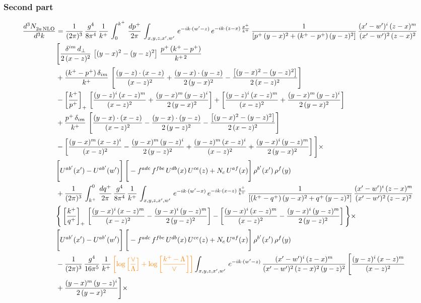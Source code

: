 \documentclass[9pt]{article}
\numberwithin{equation}{section}
\begin{document}
\subsubsection*{Second part}
\begin{align}
    \frac{d^{3}N_{2a\,\rm NLO}^{\rm}}{d^{3}k}  & =  \frac{1}{(2\pi)^{3}}\, \frac{g^{4}}{8\pi^{4}}\,\frac{1}{k^{+}}\,\int_{0}^{k^{+}}\, \frac{dp^{+}}{2\pi}\,\int_{x,y,z,x',w'}\,e^{-ik\cdot(w'-z)}\,e^{-ik\cdot (z-x)\,\frac{p^{+}}{k^{+}}}\,\frac{1}{\left[p^{+}\,(y-x)^{2}+(k^{+}-p^{+})\,(y-z)^{2}\right]}\, \frac{(x'-w')^{i}\,(z-x)^{m}}{(x'-w')^{2}\,(z-x)^{2}} \notag \\ & \Bigg[\frac{\delta^{im}\,d_{\perp}}{2\,(x-z)^{2}}\,\left[(y-x)^{2}-(y-z)^{2}\right]\,\frac{p^{+}\,(k^{+}-p^{+})}{k^{+\,2}}\notag \\ & +\frac{(k^{+}-p^{+})\,\delta_{im}}{k^{+}}\,\left[\frac{(y-z)\cdot (x-z)}{(x-z)^{2}}+\frac{(y-x)\cdot (y-z)}{2\,(y-x)^{2}}-\frac{\left[(y-x)^{2}-(y-z)^{2}\right]}{2\,(x-z)^{2}}\right]\notag \\ & -\left[\frac{k^{+}}{p^{+}}\right]_{+}\,\left[\frac{(y-z)^{i}\,(x-z)^{m}}{(x-z)^{2}}+\frac{(y-x)^{m}\,(y-z)^{i}}{2\,(y-x)^{2}}\right]+ \left[\frac{(y-z)^{i}\,(x-z)^{m}}{(x-z)^{2}}+\frac{(y-x)^{m}\,(y-z)^{i}}{2\,(y-x)^{2}}\right]\notag \\ & +\frac{p^{+}\,\delta_{im}}{k^{+}}\,\left[\frac{(y-x)\cdot (x-z)}{(x-z)^{2}}-\frac{(y-x)\cdot (y-z)}{2\,(y-z)^{2}}-\frac{\left[(y-x)^{2}-(y-z)^{2}\right]}{2\,(x-z)^{2}}\right]\notag \\ &-\left[\frac{(y-x)^{m}\,(x-z)^{i}}{(x-z)^{2}}-\frac{(y-x)^{m}\,(y-z)^{i}}{2\,(y-z)^{2}}+\frac{(y-z)^{m}\,(x-z)^{i}}{(x-z)^{2}}+\frac{(y-x)^{i}\,(y-z)^{m}}{2\,(y-x)^{2}}\right]\Bigg]\times \notag \\ & \Bigg[U^{ab'}(x')-U^{ab'}(w')\Bigg]\,\Bigg[-f^{adc}\,f^{fbe}\,U^{db}(x)\,U^{ce}(z)+N_{c}\,U^{af}(x)\Bigg]\,\rho^{b'}(x')\,\rho^{f}(y)\notag \\ & + \frac{1}{(2\pi)^{3}}\,\int^{0}_{k^{+}}\, \frac{dq^{+}}{2\pi} \,\frac{g^{4}}{8\pi^{4}}\,\frac{1}{k^{+}}\, \int_{x,y,z,x',w'}\,e^{-ik\cdot(w'-x)}\,e^{-ik\cdot (x-z)\,\frac{q^{+}}{k^{+}}}\, \frac{1}{\left[(k^{+}-q^{+})\,(y-x)^{2}+q^{+}\,(y-z)^{2}\right]}\, \frac{(x'-w')^{i}\,(z-x)^{m}}{(x'-w')^{2}\,(z-x)^{2}} \notag \\ &\Bigg\{\left[\frac{k^{+}}{q^{+}}\right]_{+}\,\left[\frac{(y-x)^{i}\,(x-z)^{m}}{(x-z)^{2}}-\frac{(y-x)^{i}\,(y-z)^{m}}{2\,(y-z)^{2}}\right] -\left[\frac{(y-x)^{i}\,(x-z)^{m}}{(x-z)^{2}}-\frac{(y-x)^{i}\,(y-z)^{m}}{2\,(y-z)^{2}}\right]\Bigg\}\times\,\notag \\ & \Bigg[U^{ab'}(x')-U^{ab'}(w')\Bigg]\,\Bigg[-f^{adc}\,f^{fbe}\,U^{db}(x)\,U^{ce}(z)+N_{c}\,U^{af}(x)\Bigg]\,\rho^{b'}(x')\,\rho^{f}(y)\notag \\ & - \frac{1}{(2\pi)^{3}}\, \frac{g^{4}}{16\pi^{5}}\,\frac{1}{k^{+}}\,{\color{orange}\left[\log{\left[\frac{\vee}{\Lambda}\right]}+\log{\left[\frac{k^{+}-\Lambda}{\vee}\right]}\right]} \int_{x,y,z,x',w'}\, e^{-ik\cdot(w'-z)}\,\frac{(x'-w')^{i}\,(z-x)^{m}}{(x'-w')^{2}\,(z-x)^{2}\, (y-z)^{2}}\,\Bigg[\frac{(y-z)^{i}\,(x-z)^{m}}{(x-z)^{2}}\notag \\ & +\frac{(y-x)^{m}\,(y-z)^{i}}{2\,(y-x)^{2}}\Bigg]\times\, 
\end{align}
\end{document}
